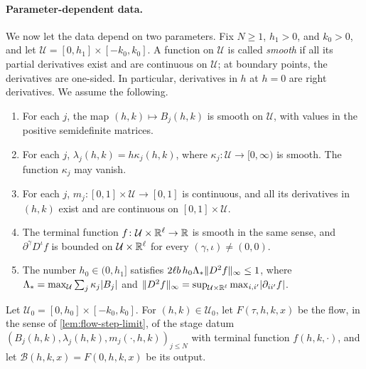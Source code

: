 \paragraph{Parameter-dependent data.}
We now let the data depend on two parameters. Fix $N\ge1$, $h_1>0$, and
$k_0>0$, and let $\mathcal U=[0,h_1]\times[-k_0,k_0]$. A function on $\mathcal U$
is called \emph{smooth} if all its partial derivatives exist and are continuous
on $\mathcal U$; at boundary points, the derivatives are one-sided. In
particular, derivatives in $h$ at $h=0$ are right derivatives. We assume the
following.
\begin{enumerate}[label=\textup{(H\arabic*)}]
\item\label{H1} For each $j$, the map $(h,k)\mapsto B_j(h,k)$ is smooth on
 $\mathcal U$, with values in the positive semidefinite matrices.
\item\label{H2} For each $j$, $\lambda_j(h,k)=h\kappa_j(h,k)$, where
 $\kappa_j\colon\mathcal U\to[0,\infty)$ is smooth. The function $\kappa_j$
 may vanish.
\item\label{H3} For each $j$, $m_j\colon[0,1]\times\mathcal U\to[0,1]$ is
 continuous, and all its derivatives in $(h,k)$ exist and are continuous on
 $[0,1]\times\mathcal U$.
\item\label{H4} The terminal function $f\colon\mathcal U\times\mathbb R^\ell\to\mathbb R$ is
 smooth in the same sense, and $\partial^\gamma D^\iota f$ is bounded on $\mathcal U\times\mathbb R^\ell$
 for every $(\gamma,\iota)\ne(0,0)$.
\item\label{H5} The number $h_0\in(0,h_1]$ satisfies
 $2\ell b\,h_0\Lambda_*\lVert D^2f\rVert_\infty\le1$, where
 $\Lambda_*=\max_{\mathcal U}\sum_j\kappa_j\lvert B_j\rvert$ and
 $\lVert D^2f\rVert_\infty=\sup_{\mathcal U\times\mathbb R^\ell}\max_{i,i'}\lvert \partial_{ii'}f\rvert$.
\end{enumerate}
Let $\mathcal U_0=[0,h_0]\times[-k_0,k_0]$. For $(h,k)\in\mathcal U_0$, let
$F(\tau,h,k,x)$ be the flow, in the sense of \cref{lem:flow-step-limit}, of the
stage datum $(B_j(h,k),\lambda_j(h,k),m_j(\cdot,h,k))_{j\le N}$ with terminal
function $f(h,k,\cdot)$, and let $\mathcal B(h,k,x)=F(0,h,k,x)$ be its output.

